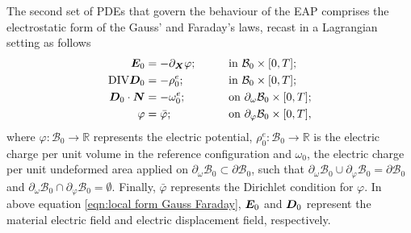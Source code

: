 The second set of PDEs that govern the behaviour of the EAP comprises the electrostatic form of the Gauss' and Faraday's laws, recast in a Lagrangian setting as follows
%
\begin{equation}\label{eqn:local form Gauss Faraday}
\begin{aligned}
\vect{E}_0& = -\partial_{\vect{X}}\varphi;&\qquad &\text{in}\,\,\mathcal{B}_0\times [0,T];\\
%
\text{DIV}\vect{D}_0 & = -\rho^e_0;&\qquad &\text{in}\,\,\mathcal{B}_0\times [0,T];\\
%
\vect{D}_0\cdot\vect{N}& = -{\omega}^e_0;&\qquad&\text{on}\,\,\partial_{\omega}\mathcal{B}_0\times [0,T];\\
%
{\varphi} &= \bar{{\varphi}};&\qquad & \text{on}\,\,\partial_{{\varphi}}\mathcal{B}_0\times [0,T],
%
\end{aligned}
\end{equation}
%
where $\varphi : \mathcal{B}_0\rightarrow \mathbb{R}$ represents the electric potential, 
 $\rho^e_0: \mathcal{B}_0\rightarrow \mathbb{R}$ is the electric charge per unit volume in the reference configuration 
 and $\omega_0$, the electric charge per unit undeformed area applied on $\partial_{\omega}\mathcal{B}_0\subset \partial \mathcal{B}_0$, such that $\partial_{\omega}\mathcal{B}_0 \cup \partial_{{\varphi}}\mathcal{B}_0 = \partial\mathcal{B}_0$ and $\partial_{\omega}\mathcal{B}_0 \cap \partial_{{\varphi}}\mathcal{B}_0 = \emptyset$. Finally, $\bar{{\varphi}}$ represents the Dirichlet condition for ${\varphi}$. In above equation \eqref{eqn:local form Gauss Faraday}, $\boldsymbol{E}_0$ and $\boldsymbol{D}_0$ represent the material electric field and electric displacement field, respectively.


